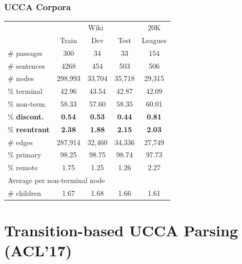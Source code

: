 \documentclass[t,xcolor={svgnames}]{beamer}
\begin{document}
\begin{frame}
\frametitle{UCCA Corpora}
\centering
\begin{tabular}{l|ccc|c}
    & \multicolumn{3}{c|}{Wiki} & 20K \\
    & \small Train & \small Dev & \small Test & Leagues \\
    \hline
    \# passages & 300 & 34 & 33 & 154 \\
    \# sentences & 4268 & 454 & 503 & 506 \\
    \hline
    \# nodes & 298,993 & 33,704 & 35,718 & 29,315 \\
    \% terminal & 42.96 & 43.54 & 42.87 & 42.09 \\
    \% non-term. & 58.33 & 57.60 & 58.35 & 60.01 \\
    \% \textbf{discont.} & \textbf{0.54} & \textbf{0.53} & \textbf{0.44} & \textbf{0.81} \\
    \% \textbf{reentrant} & \textbf{2.38} & \textbf{1.88} & \textbf{2.15} & \textbf{2.03} \\
    \hline
    \# edges & 287,914 & 32,460 & 34,336 & 27,749 \\
    \% primary & 98.25 & 98.75 & 98.74 & 97.73 \\
    \% remote & 1.75 & 1.25 & 1.26 & 2.27 \\
    \hline
    \multicolumn{3}{l}{\footnotesize Average per non-terminal node} \\
    \# children & 1.67 & 1.68 & 1.66 & 1.61 
\end{tabular}
\end{frame}



\section{Transition-based UCCA Parsing (ACL'17)}
\end{document}
